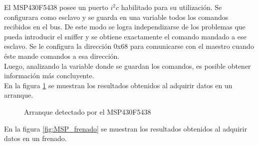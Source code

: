 \documentclass[main]{subfiles}
\begin{document}
El MSP430F5438 posee un puerto $i^2c$ habilitado para su utilización. Se configurara como esclavo y se guarda en una variable todos los comandos recibidos en el bus. De este modo se logra independizarse de los problemas que pueda introducir el sniffer y se obtiene exactamente el comando mandado a ese esclavo. Se le configura la dirección 0x68 para comunicarse con el maestro cuando éste mande comandos a esa dirección.\\

Luego, analizando la variable donde se guardan los comandos, es posible obtener información más concluyente.\\

En la figura \ref{fig:MSP_arranque} se muestran los resultados obtenidos al adquirir datos en un arranque.

\begin{figure} [h!]
\centering
  \caption{Arranque detectado por el MSP430F5438}
  \label{fig:MSP_arranque}
\end{figure}

En la figura \ref{fig:MSP_frenado} se muestran los resultados obtenidos al adquirir datos en un frenado.
\end{document}
